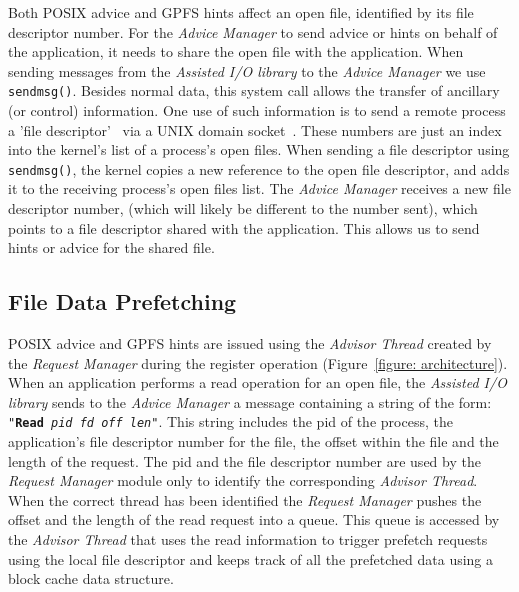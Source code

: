 Both POSIX advice and GPFS hints affect an open file, identified by its file descriptor number. For the \textit{Advice Manager} to send advice or hints on behalf of the application, it needs to share the open file with the application. When sending messages from the \textit{Assisted I/O library} to the \textit{Advice Manager} we use \texttt{sendmsg()}. Besides normal data, this system call allows the transfer of ancillary (or control) information. One use of such information is to send a remote process a 'file descriptor'~\cite{StevensR13} via a UNIX domain socket~\cite{UnixSock}. These numbers are just an index into the kernel's list of a process's open files. When sending a file descriptor using \texttt{sendmsg()}, the kernel copies a new reference to the open file descriptor, and adds it to the receiving process's open files list. The \textit{Advice Manager} receives a new file descriptor number, (which will likely be different to the number sent), which points to a file descriptor shared with the application. This allows us to send hints or advice for the shared file.

\subsection{File Data Prefetching}
\label{subsec: data_prefetching}
POSIX advice and GPFS hints are issued using the \textit{Advisor Thread} created by the \textit{Request Manager} during the register operation (Figure~\ref{figure: architecture}). When an application performs a read operation for an open file, the \textit{Assisted I/O library} sends to the \textit{Advice Manager} a message containing a string of the form: \texttt{"\textbf{Read} \textit{pid} \textit{fd} \textit{off} \textit{len}"}. This string includes the pid of the process, the application's file descriptor number for the file, the offset within the file and the length of the request. The pid and the file descriptor number are used by the \textit{Request Manager} module only to identify the corresponding \textit{Advisor Thread}. When the correct thread has been identified the \textit{Request Manager} pushes the offset and the length of the read request into a queue. This queue is accessed by the \textit{Advisor Thread} that uses the read information to trigger prefetch requests using the local file descriptor and keeps track of all the prefetched data using a block cache data structure. %


